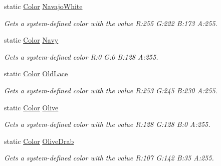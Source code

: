 \begin{DoxyCompactItemize}
static \hyperlink{struct_microsoft_1_1_xna_1_1_framework_1_1_color}{Color} \hyperlink{struct_microsoft_1_1_xna_1_1_framework_1_1_color_ad5219be8888ebb069f2468d16bb6cae0}{Navajo\+White}
\begin{DoxyCompactList}\small\item\em Gets a system-\/defined color with the value R\+:255 G\+:222 B\+:173 A\+:255.\end{DoxyCompactList}\item 
static \hyperlink{struct_microsoft_1_1_xna_1_1_framework_1_1_color}{Color} \hyperlink{struct_microsoft_1_1_xna_1_1_framework_1_1_color_a6266670e20b599f82a41a0052a043f00}{Navy}
\begin{DoxyCompactList}\small\item\em Gets a system-\/defined color R\+:0 G\+:0 B\+:128 A\+:255.\end{DoxyCompactList}\item 
static \hyperlink{struct_microsoft_1_1_xna_1_1_framework_1_1_color}{Color} \hyperlink{struct_microsoft_1_1_xna_1_1_framework_1_1_color_a3aef813721814ce947b002b9b51844f7}{Old\+Lace}
\begin{DoxyCompactList}\small\item\em Gets a system-\/defined color with the value R\+:253 G\+:245 B\+:230 A\+:255.\end{DoxyCompactList}\item 
static \hyperlink{struct_microsoft_1_1_xna_1_1_framework_1_1_color}{Color} \hyperlink{struct_microsoft_1_1_xna_1_1_framework_1_1_color_ac750de15acc22ff050c8c0b725771192}{Olive}
\begin{DoxyCompactList}\small\item\em Gets a system-\/defined color with the value R\+:128 G\+:128 B\+:0 A\+:255.\end{DoxyCompactList}\item 
static \hyperlink{struct_microsoft_1_1_xna_1_1_framework_1_1_color}{Color} \hyperlink{struct_microsoft_1_1_xna_1_1_framework_1_1_color_aed90c62ffd1b0473d880ef8859e9fd7b}{Olive\+Drab}
\begin{DoxyCompactList}\small\item\em Gets a system-\/defined color with the value R\+:107 G\+:142 B\+:35 A\+:255.\end{DoxyCompactList}\item 

\end{DoxyCompactItemize}
